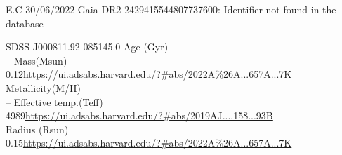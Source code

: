 E.C 30/06/2022
Gaia DR2 2429415544807737600: Identifier not found in the database

SDSS J000811.92-085145.0
Age (Gyr)\\
--
Mass(Msun)\\
0.12\url{https://ui.adsabs.harvard.edu/?#abs/2022A%26A...657A...7K}\\
Metallicity(M/H)\\
--
Effective temp.(Teff)\\
4989\url{https://ui.adsabs.harvard.edu/?#abs/2019AJ....158...93B}\\
Radius (Rsun)\\
0.15\url{https://ui.adsabs.harvard.edu/?#abs/2022A%26A...657A...7K}\\